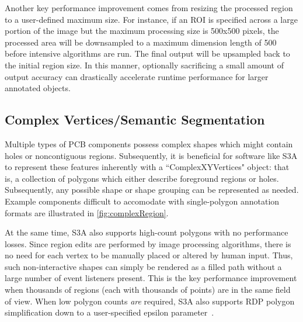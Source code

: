 Another key performance improvement comes from resizing the processed region to a user-defined maximum size. For instance, if an ROI is specified across a large portion of the image but the maximum processing size is 500x500 pixels, the processed area will be downsampled to a maximum dimension length of 500 before intensive algorithms are run. The final output will be upsampled back to the initial region size. In this manner, optionally sacrificing a small amount of output accuracy can drastically accelerate runtime performance for larger annotated objects.

\makeRegionEditFig

\subsection{Complex Vertices/Semantic Segmentation}
Multiple types of PCB components possess complex shapes which might contain holes or noncontiguous regions. Subsequently, it is beneficial for software like S3A to represent these features inherently with a ``ComplexXYVertices" object: that is, a collection of polygons which either describe foreground regions or holes. Subsequently, any possible shape or shape grouping can be represented as needed. Example components difficult to accomodate with single-polygon annotation formats are illustrated in \autoref{fig:complexRegion}.

\makeComplexRegionFig

At the same time, S3A also supports high-count polygons with no performance losses. Since region edits are performed by image processing algorithms, there is no need for each vertex to be manually placed or altered by human input. Thus, such non-interactive shapes can simply be rendered as a filled path without a large number of event listeners present. This is the key performance improvement when thousands of regions (each with thousands of points) are in the same field of view. When low polygon counts \emph{are} required, S3A also supports RDP polygon simplification down to a user-specified epsilon parameter~\cite{ramer_iterative_1972}.


